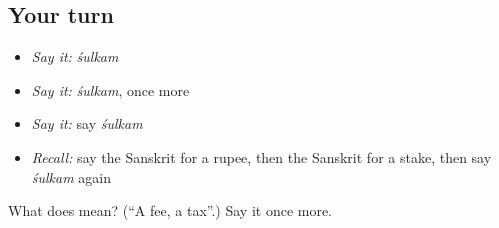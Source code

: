 \subsection*{Your turn}
\begin{itemize}
\raggedright
  \item \emph{Say it:} \emph{śulkam}
  \item \emph{Say it:} \emph{śulkam}, once more
  \item \emph{Say it:} say \emph{śulkam}
  \item \emph{Recall:} say the Sanskrit for a rupee, then the Sanskrit for a stake, then say \emph{śulkam} again
\end{itemize}

\begin{tcolorbox}[breakable,colback=teal!4,colframe=teal!35!black,title={Before you move on}]
What does  mean? (\textquotedblleft{}A fee, a tax\textquotedblright{}.) Say it once more.
\end{tcolorbox}
